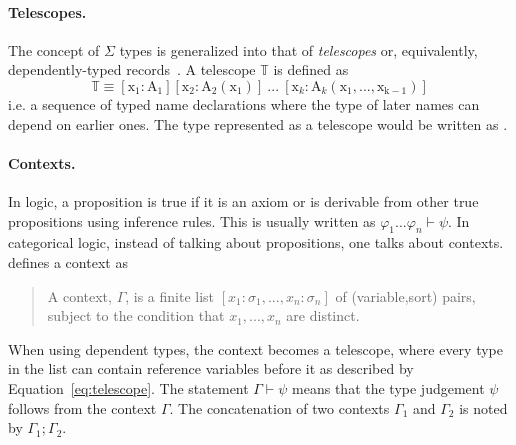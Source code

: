 \paragraph{Telescopes.}
The concept of $\Sigma$ types is generalized into that of \emph{telescopes} or, equivalently, dependently-typed records~\cite{pollack2002dependently}. A telescope $\mathbb{T}$ is defined as 
\begin{equation}
\mathbb{T} \equiv [\text{x}_1 : \text{A}_1]
[\text{x}_2 : \text{A}_2(\text{x}_1)] \ ... \ 
[\text{x}_k : \text{A}_k(\text{x}_1,...,\text{x}_{\text{k}-1})]
\label{eq:telescope}
\end{equation} 
i.e. a sequence of typed name declarations where the type of later names can depend on earlier ones. 
The type \lstmath{Vec A n} represented as a telescope would be written as 
\lstmath{[A : Type][n :$\ \mathbb{N}$][Vec A n]}. 


\paragraph{Contexts.}
In logic, a proposition is true if it is an axiom or is derivable from other true propositions using inference rules. This is usually written as $\varphi_1 ... \varphi_n \vdash \psi$.  In categorical logic, instead of talking about propositions, one talks about contexts. \cite{handbook1993CategoricalLogic} defines a context as 
\begin{quote}
A context, $\Gamma$, is a finite list $[x_1 : \sigma_1, ... , x_n : \sigma_n]$ of (variable,sort) pairs, subject to the condition that $x_1, ... , x_n$ are distinct.  
\end{quote}
When using dependent types, the context becomes a telescope, where every type in the list can contain reference variables before it as described by Equation~\ref{eq:telescope}. The statement $\Gamma \vdash \psi$ means that the type judgement $\psi$ follows from the context $\Gamma$. The concatenation of two contexts $\Gamma_1$ and $\Gamma_2$ is noted by $\Gamma_1 ; \Gamma_2$.  

